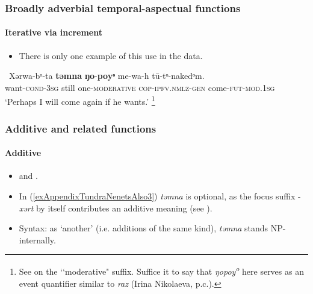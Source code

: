 \pagebreak
\subsubsection{Broadly adverbial temporal-aspectual functions}
\paragraph{Iterative via increment}
\label{appendixTundraNenetsIterativeIncrement}
\begin{itemize}
	\item There is only one example of this use in the data.
\end{itemize}
\begin{exe}
	\ex\
	 \gll Xərwa-bᵒ-ta \textbf{təmna} \textbf{ŋo}-\textbf{poyᵒ} me-wa-h tū-tᵒ-nakedᵒm.\\
	want-\textsc{cond}-3\textsc{sg} still one-\textsc{moderative} \textsc{cop}-\textsc{ipfv}.\textsc{nmlz}-\textsc{gen} come-\textsc{fut}-\textsc{mod}.1\textsc{sg}\\
	\glt \lq Perhaps I will come again if he wants.' \parencite[100]{Nikolaeva2014}\footnote{See \textcite[135]{Nikolaeva2014} on the \lq\lq moderative" suffix. Suffice it to say that \textit{ŋopoy\textsuperscript{o}} here serves as an event quantifier similar to  \textit{raz} (Irina Nikolaeva, p.c.).}
\end{exe}


\subsubsection{Additive and related functions}
\paragraph{Additive}\label{appendixTundraNenetsAdditive}
	\begin{itemize}
	\item \textcite[186]{Nikolaeva2014} and \textcite[623]{Tereshchenko2008}.
	\item In (\ref{exAppendixTundraNenetsAlso3}) \textit{təmna} is optional, as the focus suffix \mbox{-\textit{xərt}} by itself contributes an additive meaning (see \cite[128–129]{Nikolaeva2014}).
	\item Syntax: as \lq another\rq{ }(i.e. additions of the same kind), \textit{təmna} stands NP\hyp internally.
	\end{itemize}
	
